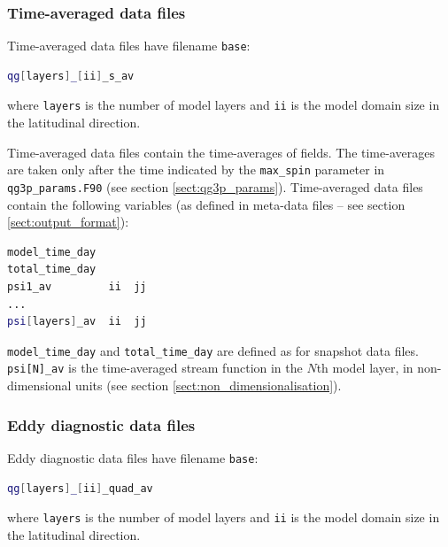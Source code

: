 \documentclass[a4paper]{book}
\begin{document}
\subsubsection{Time-averaged data files}

Time-averaged data files have filename \verb+base+:
\begin{lstlisting}[language = bash, frame = single]
qg[layers]_[ii]_s_av
\end{lstlisting}
where \verb+layers+ is the number of model layers and \verb+ii+ is the model
domain size in the latitudinal direction.

Time-averaged data files contain the time-averages of fields. The time-averages
are taken only after the time indicated by the \verb+max_spin+ parameter in
\verb+qg3p_params.F90+ (see section \ref{sect:qg3p_params}). Time-averaged
data files contain the following variables (as defined in meta-data files -- see
section \ref{sect:output_format}):
\begin{lstlisting}[language = bash, frame = single]
model_time_day
total_time_day
psi1_av         ii  jj
...
psi[layers]_av  ii  jj
\end{lstlisting}

\verb+model_time_day+ and \verb+total_time_day+ are defined as for snapshot
data files. \verb+psi[N]_av+ is the time-averaged stream function in the $N$th
model layer, in non-dimensional units (see section
\ref{sect:non_dimensionalisation}).

\subsubsection{Eddy diagnostic data files}

Eddy diagnostic data files have filename \verb+base+:
\begin{lstlisting}[language = bash, frame = single]
qg[layers]_[ii]_quad_av
\end{lstlisting}
where \verb+layers+ is the number of model layers and \verb+ii+ is the model
domain size in the latitudinal direction.
\end{document}
